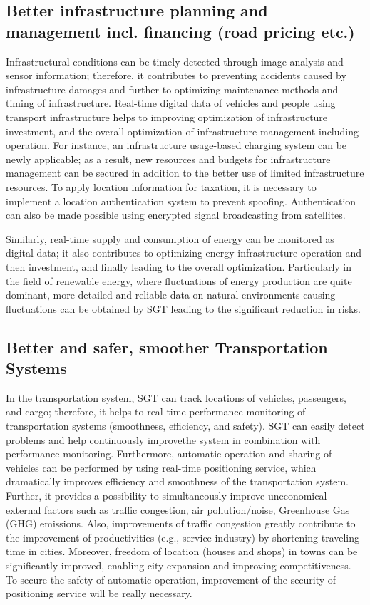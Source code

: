 \subsection{Better infrastructure planning and management incl. financing (road pricing etc.)}

\tab Infrastructural conditions can be timely detected through image analysis and sensor information; therefore, it contributes to preventing accidents caused by infrastructure damages and further to optimizing maintenance methods and timing of infrastructure. Real-time digital data of vehicles and people using transport infrastructure helps to improving optimization of infrastructure investment, and the overall optimization of infrastructure management including operation. For instance, an infrastructure usage-based charging system can be newly applicable; as a result, new resources and budgets for infrastructure management can be secured in addition to the better use of limited infrastructure resources. To apply location information for taxation, it is necessary to implement a location authentication system to prevent spoofing. Authentication can also be made possible using encrypted signal broadcasting from satellites.

Similarly, real-time supply and consumption of energy can be monitored as digital data; it also contributes to optimizing energy infrastructure operation and then investment, and finally leading to the overall optimization. Particularly in the field of renewable energy, where fluctuations of energy production are quite dominant, more detailed and reliable data on natural environments causing fluctuations can be obtained by SGT leading to the significant reduction in risks.

\subsection{Better and safer, smoother Transportation Systems}

\tab In the transportation system, SGT can track locations of vehicles, passengers, and cargo; therefore, it helps to real-time performance monitoring of transportation systems (smoothness, efficiency, and safety). SGT can easily detect problems and help continuously improvethe system in combination with performance monitoring. Furthermore, automatic operation and sharing of vehicles can be performed by using real-time positioning service, which dramatically improves efficiency and smoothness of the transportation system. Further, it provides a possibility to simultaneously improve uneconomical external factors such as traffic congestion, air pollution/noise, Greenhouse Gas (GHG) emissions. Also, improvements of traffic congestion greatly contribute to the improvement of productivities (e.g., service industry) by shortening traveling time in cities. Moreover, freedom of location (houses and shops) in towns can be significantly improved, enabling city expansion and improving competitiveness. To secure the safety of automatic operation, improvement of the security of positioning service will be really necessary.

